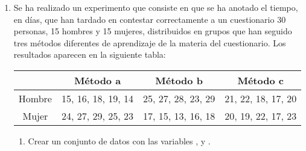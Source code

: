 \begin{enumerate}[leftmargin=*]
\begin{enumerate}
\item Teniendo en cuenta que hay interacción significativa, calcular el intervalo de confianza para la diferencia de
medias en los kg perdidos según la variable dieta y fármaco, así como entre los grupos que surgen de su interacción.
\begin{indicacion}{
\begin{enumerate}
\item Seleccionar el menú \texttt{Teaching\flecha Tests paramétricos\flecha Medias\flecha ANOVA}.
\item En el cuadro de diálogo que aparece, seleccionar el conjunto de datos .
\item Seleccionar la variable  como  y las variables  y  en el campo .
\item En la solapa  seleccionar la opción  y hacer
click sobre el botón .
\end{enumerate}
}
\end{indicacion}
\end{enumerate}


\item Se ha realizado un experimento que consiste en que se ha anotado el tiempo, en días, que han tardado en contestar
correctamente a un cuestionario 30 personas, 15 hombres y 15 mujeres, distribuidos en grupos que han seguido tres
métodos diferentes de aprendizaje de la materia del cuestionario. Los resultados aparecen en la siguiente tabla:

\begin{center}
\begin{tabular}{|c|c|c|c|}
\cline{2-4}
\multicolumn{1}{c|}{} & Método a & Método b & Método c\\
\hline
Hombre & 15, 16, 18, 19, 14 & 25, 27, 28, 23, 29 & 21, 22, 18, 17, 20 \\
\hline
Mujer & 24, 27, 29, 25, 23 & 17, 15, 13, 16, 18 & 20, 19, 22, 17, 23 \\
\hline
\end{tabular}
\end{center}

\begin{enumerate}
\item Crear un conjunto de datos  con las variables ,  y .


\end{enumerate}
\end{enumerate}
